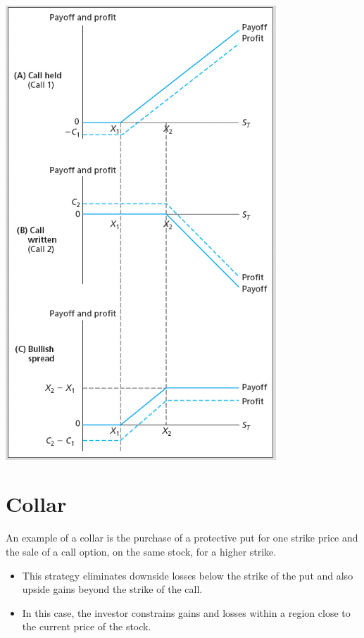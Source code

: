 \documentclass[letterpaper,10pt,english]{sphinxmanual}
\begin{document}
\includegraphics[width=4in]{bod34698_1510_lg.jpg}


\section{Collar}
\label{options:collar}
An example of a collar is the purchase of a protective put for one
strike price and the sale of a call option, on the same stock, for a
higher strike.
\begin{itemize}
\item {} 
This strategy eliminates downside losses below the strike of the put
and also upside gains beyond the strike of the call.

\end{itemize}
\begin{itemize}
\item {} 
In this case, the investor constrains gains and losses within a
region close to the current price of the stock.

\end{itemize}
\end{document}
